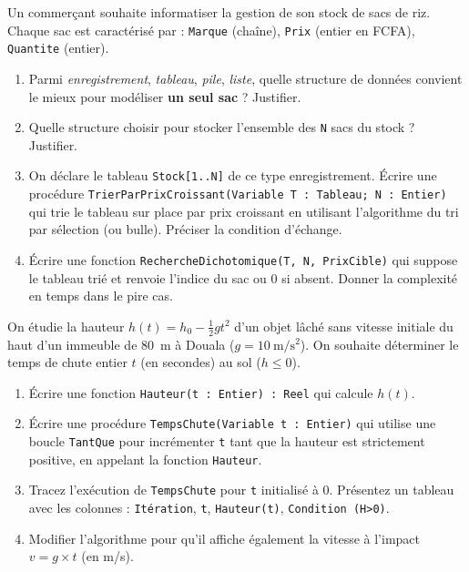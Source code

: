 \documentclass[11pt]{article}
\begin{document}
\begin{exercice}
Un commerçant souhaite informatiser la gestion de son stock de sacs de riz. Chaque sac est caractérisé par : \texttt{Marque} (chaîne), \texttt{Prix} (entier en FCFA), \texttt{Quantite} (entier).
\begin{enumerate}
    \item Parmi \textit{enregistrement}, \textit{tableau}, \textit{pile}, \textit{liste}, quelle structure de données convient le mieux pour modéliser \textbf{un seul sac} ? Justifier.
    \item Quelle structure choisir pour stocker l'ensemble des \texttt{N} sacs du stock ? Justifier.
    \item On déclare le tableau \texttt{Stock[1..N]} de ce type enregistrement. Écrire une procédure \texttt{TrierParPrixCroissant(Variable T : Tableau; N : Entier)} qui trie le tableau sur place par prix croissant en utilisant l'algorithme du tri par sélection (ou bulle). Préciser la condition d'échange.
    \item Écrire une fonction \texttt{RechercheDichotomique(T, N, PrixCible)} qui suppose le tableau trié et renvoie l'indice du sac ou 0 si absent. Donner la complexité en temps dans le pire cas.
\end{enumerate}
\end{exercice}

\begin{exercice}
On étudie la hauteur $h(t) = h_0 - \frac{1}{2}gt^2$ d'un objet lâché sans vitesse initiale du haut d'un immeuble de \SI{80}{\meter} à Douala ($g = \SI{10}{\meter\per\second\squared}$). On souhaite déterminer le temps de chute entier $t$ (en secondes) au sol ($h \le 0$).
\begin{enumerate}
    \item Écrire une fonction \texttt{Hauteur(t : Entier) : Reel} qui calcule $h(t)$.
    \item Écrire une procédure \texttt{TempsChute(Variable t : Entier)} qui utilise une boucle \texttt{TantQue} pour incrémenter \texttt{t} tant que la hauteur est strictement positive, en appelant la fonction \texttt{Hauteur}.
    \item Tracez l'exécution de \texttt{TempsChute} pour \texttt{t} initialisé à 0. Présentez un tableau avec les colonnes : \texttt{Itération}, \texttt{t}, \texttt{Hauteur(t)}, \texttt{Condition (H>0)}.
    \item Modifier l'algorithme pour qu'il affiche également la vitesse à l'impact $v = g \times t$ (en m/s).
\end{enumerate}
\end{exercice}
\end{document}
